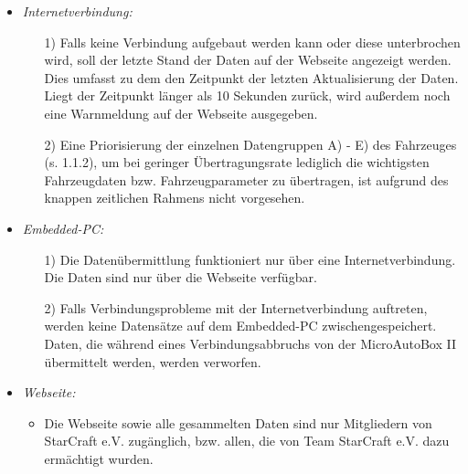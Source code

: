 \documentclass[fontsize = 12pt, paper = a4]{scrreprt}
\begin{document}
\begin{itemize}

\item \textit{Internetverbindung:}

\begin{itemize}

\item[1)] 
Falls keine Verbindung aufgebaut werden kann oder diese unterbrochen wird, soll der letzte Stand der Daten auf der Webseite angezeigt werden. Dies umfasst zu dem den Zeitpunkt der letzten Aktualisierung der Daten. Liegt der Zeitpunkt länger als 10 Sekunden zurück, wird außerdem noch eine Warnmeldung auf der Webseite ausgegeben.

\item[2)] Eine Priorisierung der einzelnen Datengruppen A) - E) des Fahrzeuges (s. 1.1.2), um bei geringer Übertragungsrate lediglich die wichtigsten Fahrzeugdaten bzw. Fahrzeugparameter zu übertragen, ist aufgrund des knappen zeitlichen Rahmens nicht vorgesehen.


\end{itemize}

\item \textit{\gls{Embedded-PC}:}

\begin{itemize}

\item[1)] 
Die Datenübermittlung funktioniert nur über eine Internetverbindung. Die Daten sind nur über die Webseite verfügbar.

\item[2)]
Falls Verbindungsprobleme mit der Internetverbindung auftreten, werden keine Datensätze auf dem \gls{Embedded-PC} zwischengespeichert. Daten, die während eines Verbindungsabbruchs von der \gls{MicroAutoBox II} übermittelt werden, werden verworfen.


\end{itemize}

\item \textit{Webseite:}

\begin{itemize}

\item
Die Webseite sowie alle gesammelten Daten sind nur Mitgliedern von StarCraft e.V. zugänglich, bzw. allen, die von Team StarCraft e.V. dazu ermächtigt wurden. 



\end{itemize}

\end{itemize}
\end{document}

